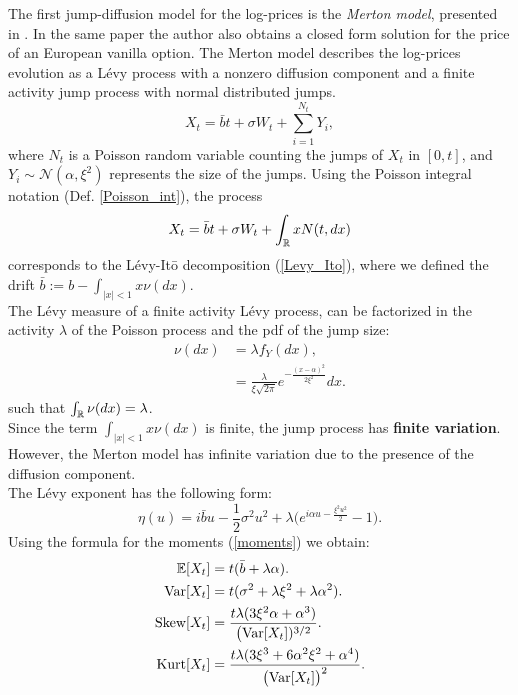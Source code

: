 The first jump-diffusion model for the log-prices is the \emph{Merton model}, presented in 
\cite{Me76}. In the same paper the author also obtains a closed form solution for the price of an European vanilla option. 
The Merton model describes the log-prices evolution as a Lévy process with a nonzero diffusion 
component and a finite activity jump process with normal distributed jumps.
\begin{equation}\label{MertonM}
X_t = \bar b t + \sigma W_t + \sum_{i=1}^{N_t} Y_i, 
\end{equation}
where $N_t$ is a Poisson random variable counting the jumps of $X_t$ in $[0,t]$, and $Y_i \sim \mathcal{N}(\alpha, \xi^2)$ represents the size of the jumps.
Using the Poisson integral notation (Def. \ref{Poisson_int}), the process
\begin{equation*}
 X_t = \bar b t + \sigma W_t + \int_{\mathbb{R}} x N(t,dx)
\end{equation*}
corresponds to the Lévy-It\={o} decomposition (\ref{Levy_Ito}),  
where we defined the drift
$\bar b := b - \int_{|x|<1} x \nu(dx)$.\\
The Lévy measure of a finite activity Lévy process, can be factorized in the activity $\lambda$ of the Poisson process and 
the pdf of the jump size:
\begin{align*}
 \nu(dx) &= \lambda f_Y(dx), \\
	 &= \frac{\lambda}{\xi \sqrt{2\pi}} e^{- \frac{(x-\alpha)^2}{2\xi^2}} dx.  
\end{align*}
such that $\int_{\mathbb{R}} \nu(dx) = \lambda$.\\
Since the term $\int_{|x|<1} x \nu(dx)$ is finite, the jump process has \textbf{finite variation}. However, 
the Merton model has infinite variation due to the presence of the diffusion component.\\ 
The Lévy exponent has the following form:
\begin{equation}
 \eta(u) = i\bar b u - \frac{1}{2} \sigma^2 u^2 + \lambda \biggl( e^{i\alpha u -\frac{\xi^2 u^2}{2} }-1 \biggr). 
\end{equation}
\newline
Using the formula for the moments (\ref{moments}) we obtain:
\begin{align}\label{Merton_moments}
 \mathbb{E}[X_t] &= t(\bar b+\lambda \alpha). \\ \nonumber
 \mbox{Var}[X_t] &= t(\sigma^2 + \lambda \xi^2 + \lambda \alpha^2). \\ \nonumber
 \mbox{Skew}[X_t] &= \frac{t\lambda (3\xi^2 \alpha + \alpha^3)}{\bigl(\mbox{Var}[X_t])^{3/2}}. \\ \nonumber
 \mbox{Kurt}[X_t] &= \frac{t \lambda (3\xi^3 +6\alpha^2\xi^2 +\alpha^4)}{\bigl(\mbox{Var}[X_t]\bigr)^2}. \nonumber
\end{align} \newline
